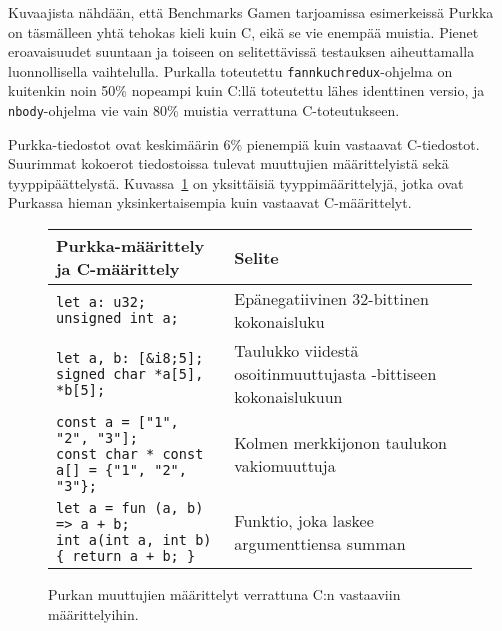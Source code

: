 Kuvaajista nähdään, että Benchmarks Gamen tarjoamissa esimerkeissä Purkka on
täsmälleen yhtä tehokas kieli kuin C, eikä se vie enempää muistia. Pienet
eroavaisuudet suuntaan ja toiseen on selitettävissä testauksen aiheuttamalla
luonnollisella vaihtelulla. Purkalla toteutettu \texttt{fannkuchredux}-ohjelma
on kuitenkin noin 50\% nopeampi kuin C:llä toteutettu lähes identtinen versio,
ja \texttt{nbody}-ohjelma vie vain 80\% muistia verrattuna C-toteutukseen.

Purkka-tiedostot ovat keskimäärin 6\% pienempiä kuin vastaavat C-tiedostot.
Suurimmat kokoerot tiedostoissa tulevat muuttujien määrittelyistä sekä
tyyppipäättelystä. Kuvassa~\ref{fig:declarations} on yksittäisiä
tyyppimäärittelyjä, jotka ovat Purkassa hieman yksinkertaisempia kuin vastaavat
C-määrittelyt.

\begin{figure}[ht!]
    \begin{adjustbox}{center}
        \begin{tabular}{@{} m{} m{} @{}} \toprule
            Purkka-määrittely ja C-määrittely & Selite \\ \midrule

            \texttt{let a: u32; \newline unsigned int a;} & Epänegatiivinen 32-bittinen kokonaisluku \\
            \noalign{\vspace{0.3cm}}

            \texttt{let a, b: [\&i8;5]; \newline signed char *a[5], *b[5];} & Taulukko viidestä osoitinmuuttujasta \newline 8-bittiseen kokonaislukuun \\
            \noalign{\vspace{0.3cm}}

            \texttt{const a = ["1", "2", "3"]; \newline const char * const a[] = \{"1", "2", "3"\};} & Kolmen merkkijonon taulukon vakiomuuttuja \\
            \noalign{\vspace{0.3cm}}

            \texttt{let a = fun (a, b) => a + b; \newline int a(int a, int b) \{ return a + b; \}} & Funktio, joka laskee argumenttiensa summan \\ \bottomrule
        \end{tabular}
    \end{adjustbox}
    \label{fig:declarations}
    \caption{Purkan muuttujien määrittelyt verrattuna C:n vastaaviin
    määrittelyihin.}
\end{figure}

